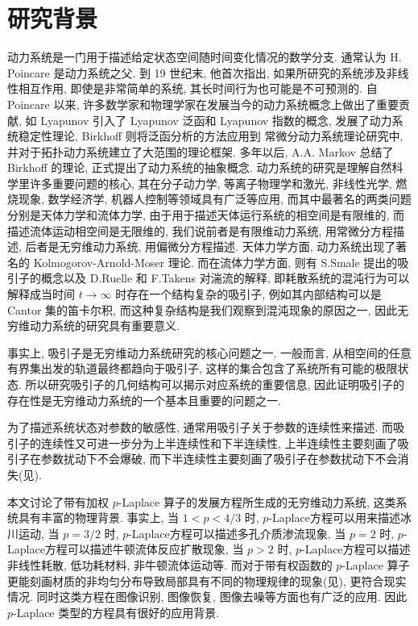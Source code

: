 \documentclass[oneside,longtitle]{LZUthesis}
\numberwithin{equation}{chapter}
\begin{document}
\section{研究背景}
动力系统是一门用于描述给定状态空间随时间变化情况的数学分支.
通常认为 H. Poincare 是动力系统之父.
到 19 世纪末, 他首次指出, 如果所研究的系统涉及非线性相互作用,
即使是非常简单的系统, 其长时间行为也可能是不可预测的.
自 Poincare 以来,
许多数学家和物理学家在发展当今的动力系统概念上做出了重要贡献,
如 Lyapunov 引入了 Lyapunov 泛函和 Lyapunov 指数的概念,
发展了动力系统稳定性理论, Birkhoff 则将泛函分析的方法应用到
常微分动力系统理论研究中, 并对于拓扑动力系统建立了大范围的理论框架.
多年以后, A.A. Markov 总结了 Birkhoff 的理论, 正式提出了动力系统的抽象概念.
动力系统的研究是理解自然科学里许多重要问题的核心,
其在分子动力学, 等离子物理学和激光, 非线性光学, 燃烧现象, 数学经济学, 机器人控制等领域具有广泛等应用,
而其中最著名的两类问题分别是天体力学和流体力学,
由于用于描述天体运行系统的相空间是有限维的, 而描述流体运动相空间是无限维的,
我们说前者是有限维动力系统, 用常微分方程描述, 后者是无穷维动力系统, 用偏微分方程描述.
天体力学方面, 动力系统出现了著名的 Kolmogorov-Arnold-Moser 理论.
而在流体力学方面, 则有 S.Smale 提出的吸引子的概念以及 D.Ruelle 和 F.Takens 对湍流的解释,
即耗散系统的混沌行为可以解释成当时间
$t \to \infty$ 时存在一个结构复杂的吸引子, 例如其内部结构可以是 Cantor 集的笛卡尔积,
而这种复杂结构是我们观察到混沌现象的原因之一, 因此无穷维动力系统的研究具有重要意义.

事实上, 吸引子是无穷维动力系统研究的核心问题之一.
一般而言, 从相空间的任意有界集出发的轨道最终都趋向于吸引子,
这样的集合包含了系统所有可能的极限状态.
所以研究吸引子的几何结构可以揭示对应系统的重要信息,
因此证明吸引子的存在性是无穷维动力系统的一个基本且重要的问题之一.

为了描述系统状态对参数的敏感性, 通常用吸引子关于参数的连续性来描述.
而吸引子的连续性又可进一步分为上半连续性和下半连续性, 上半连续性主要刻画了吸引子在参数扰动下不会爆破,
而下半连续性主要刻画了吸引子在参数扰动下不会消失(见\citep{robinsonInfiniteDimensionalDynamicalSystems2001a}).

本文讨论了带有加权 $p$-Laplace 算子的发展方程所生成的无穷维动力系统,
这类系统具有丰富的物理背景.
事实上, 当 $1 < p < 4/3$ 时, $p$-Laplace方程可以用来描述冰川运动,
当 $p = 3/2$ 时, $p$-Laplace方程可以描述多孔介质渗流现象,
当 $p = 2$ 时, $p$-Laplace方程可以描述牛顿流体反应扩散现象,
当 $p > 2$ 时, $p$-Laplace方程可以描述非线性耗散, 低功耗材料, 非牛顿流体运动等.
而对于带有权函数的 $p$-Laplace 算子更能刻画材质的非均匀分布导致局部具有不同的物理规律的现象(见\citep{lionsMathematicalTopicsFluid1996}),
更符合现实情况. 同时这类方程在图像识别, 图像恢复, 图像去噪等方面也有广泛的应用.
因此 $p$-Laplace 类型的方程具有很好的应用背景.
\end{document}
